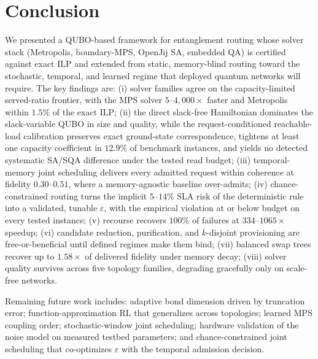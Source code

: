 \documentclass[twocolumn]{article}
\begin{document}
\section{Conclusion}
\label{sec:conclusion}

We presented a QUBO-based framework for entanglement routing whose
solver stack (Metropolis, boundary-MPS, OpenJij SA, embedded QA) is
certified against exact ILP and extended from static, memory-blind
routing toward the stochastic, temporal, and learned regime that
deployed quantum networks will require.  The key findings are:
(i) solver families agree on the capacity-limited served-ratio
frontier, with the MPS solver $5$--$4{,}000\times$
faster and Metropolis within $1.5\%$ of the exact ILP; (ii) the
direct slack-free Hamiltonian dominates the slack-variable QUBO in
size and quality, while the request-conditioned reachable-load
calibration preserves exact ground-state correspondence, tightens at
least one capacity coefficient in $12.9\%$ of benchmark instances, and
yields no detected systematic SA/SQA difference under the tested read
budget;
(iii) temporal-memory joint scheduling delivers
every admitted request within coherence at fidelity $0.30$--$0.51$,
where a memory-agnostic baseline over-admits; (iv) chance-constrained
routing turns the implicit $5$--$14\%$ SLA risk of the deterministic
rule into a validated, tunable $\varepsilon$, with the empirical
violation at or below budget on every tested instance; (v) recourse
recovers $100\%$ of failures at $334$--$1065\times$ speedup; (vi)
candidate reduction, purification, and $k$-disjoint provisioning are
free-or-beneficial until defined regimes make them bind; (vii)
balanced swap trees recover up to $1.58\times$ of delivered fidelity
under memory decay; (viii) solver quality survives across five
topology families, degrading gracefully only on scale-free networks.

Remaining future work includes: adaptive bond dimension driven by
truncation error; function-approximation RL that generalizes across
topologies; learned MPS coupling order; stochastic-window joint
scheduling; hardware validation of the noise model on measured testbed
parameters; and chance-constrained joint scheduling that co-optimizes
$\varepsilon$ with the temporal admission decision.
\end{document}
